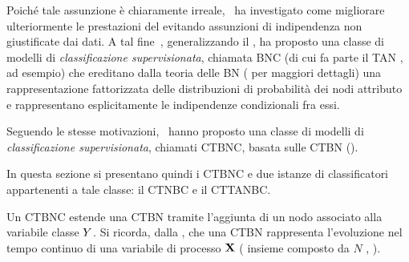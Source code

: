 Poiché tale assunzione è chiaramente irreale,~\citet{Friedman1997} ha investigato come migliorare ulteriormente le prestazioni del \lwcase \nb{} \class{} evitando assunzioni di indipendenza non giustificate dai dati. A tal fine~\citet{Friedman1997}, generalizzando il \lwcase \nb{} \class{}, ha proposto una classe di modelli di \emph{classificazione supervisionata}, chiamata \acf{BNC} (di cui fa parte il \acf{TAN} \class{}, ad esempio) che ereditano dalla teoria delle \acl{BN} ( per maggiori dettagli) una rappresentazione fattorizzata delle distribuzioni di probabilità dei nodi attributo e rappresentano esplicitamente le indipendenze condizionali fra essi.

Seguendo le stesse motivazioni,~\citet{Stella2012} hanno proposto una classe di modelli di \emph{classificazione supervisionata}, chiamati \acf{CTBNC}, basata sulle \acs{CTBN} ().

In questa sezione si presentano quindi i \acl{CTBNC} e due istanze di classificatori appartenenti a tale classe: il \acf{CTNBC} e il \acf{CTTANBC}.

Un \acl{CTBNC} estende una \acs{CTBN} tramite l'aggiunta di un nodo associato alla variabile classe $\mathnormal{Y}$. Si ricorda, dalla , che una \acs{CTBN} rappresenta l'evoluzione nel tempo continuo di una variabile di processo $\mathbf{X}$ (\ie{} insieme composto da $N$ \mprocess{}, ).

